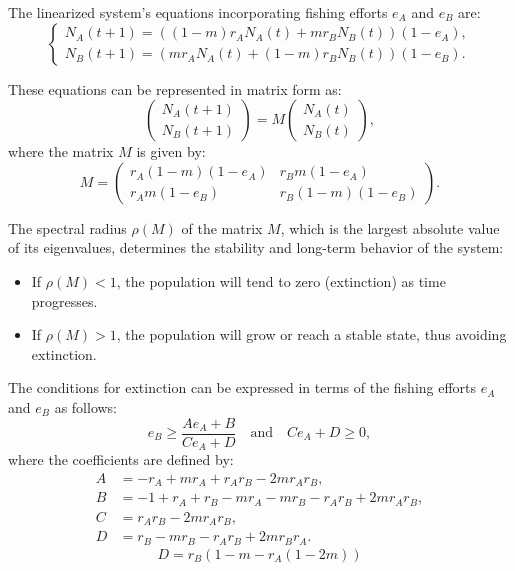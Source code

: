\documentclass{article}
\begin{document}
The linearized system's equations incorporating fishing efforts $e_A$ and $e_B$ are:
\begin{equation*}
    \begin{cases}
        N_A(t+1) = \left((1-m)r_A N_A(t) + m r_B N_B(t) \right)(1-e_A), \\
        N_B(t+1) = \left(m r_A N_A(t) + (1-m) r_B N_B(t) \right)(1-e_B).
    \end{cases}
\end{equation*}

These equations can be represented in matrix form as:
\[
\begin{pmatrix}
    N_A(t+1) \\
    N_B(t+1)
\end{pmatrix}
= M
\begin{pmatrix}
    N_A(t) \\
    N_B(t)
\end{pmatrix},
\]
where the matrix $M$ is given by:
\[
M = \begin{pmatrix}
    r_A (1-m)(1-e_A) & r_B m (1-e_A) \\
    r_A m (1-e_B) & r_B (1-m)(1-e_B)
\end{pmatrix}.
\]

The spectral radius $\rho(M)$ of the matrix $M$, which is the largest absolute value of its eigenvalues, determines the stability and long-term behavior of the system:
\begin{itemize}
    \item If $\rho(M) < 1$, the population will tend to zero (extinction) as time progresses.
    \item If $\rho(M) > 1$, the population will grow or reach a stable state, thus avoiding extinction.
\end{itemize}


The conditions for extinction can be expressed in terms of the fishing efforts $e_A$ and $e_B$ as follows:
\[
e_B \geq \frac{A e_A + B}{C e_A + D} \quad \text{and} \quad C e_A + D \geq 0,
\]
where the coefficients are defined by:
\begin{align*}
    A &= -r_A + m r_A + r_A r_B - 2 m r_A r_B, \\
    B &= -1 + r_A + r_B - m r_A - m r_B - r_A r_B + 2 m r_A r_B, \\
    C &= r_A r_B - 2 m r_A r_B, \\
    D &= r_B - m r_B - r_A r_B + 2 m r_B r_A.
\end{align*}
$$D = r_B(1-m-r_A(1-2m))$$
\end{document}
